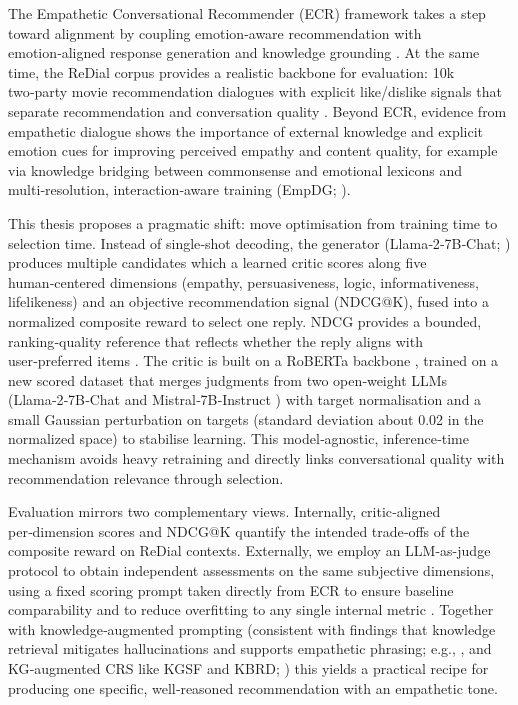 \documentclass[12pt]{article}
\begin{document}
  The Empathetic Conversational Recommender (ECR) framework takes a step toward alignment by coupling emotion‑aware recommendation with emotion‑aligned response generation and knowledge grounding \citep{zhang2024ecr}. At the same time, the ReDial corpus provides a realistic backbone for evaluation: 10k two‑party movie recommendation dialogues with explicit like/dislike signals that separate recommendation and conversation quality \citep{charlin2018redial}. Beyond ECR, evidence from empathetic dialogue shows the importance of external knowledge and explicit emotion cues for improving perceived empathy and content quality, for example via knowledge bridging between commonsense and emotional lexicons \citep{zeng2022knowledgebridging} and multi‑resolution, interaction‑aware training (EmpDG; \citealp{li2020empdg}).
  
  This thesis proposes a pragmatic shift: move optimisation from training time to selection time. Instead of single‑shot decoding, the generator (Llama‑2‑7B‑Chat; \citealp{meta2023llama2}) produces multiple candidates which a learned critic scores along five human‑centered dimensions (empathy, persuasiveness, logic, informativeness, lifelikeness) and an objective recommendation signal (NDCG@K), fused into a normalized composite reward to select one reply. NDCG provides a bounded, ranking‑quality reference that reflects whether the reply aligns with user‑preferred items \citep{evidently_ndcg}. The critic is built on a RoBERTa backbone \citep{liu2019roberta}, trained on a new scored dataset that merges judgments from two open‑weight LLMs (Llama‑2‑7B‑Chat \citep{meta2023llama2} and Mistral‑7B‑Instruct \citep{mistral2023}) with target normalisation and a small Gaussian perturbation on targets (standard deviation about 0.02 in the normalized space) to stabilise learning. This model‑agnostic, inference‑time mechanism avoids heavy retraining and directly links conversational quality with recommendation relevance through selection.
  
  Evaluation mirrors two complementary views. Internally, critic‑aligned per‑dimension scores and NDCG@K quantify the intended trade‑offs of the composite reward on ReDial contexts. 
  Externally, we employ an LLM-as-judge protocol to obtain independent assessments on the same subjective dimensions, using a fixed scoring prompt taken directly from ECR to ensure baseline comparability and to reduce overfitting to any single internal metric \citep{zhang2024ecr,yan2023llmjudge}. Together with knowledge‑augmented prompting (consistent with findings that knowledge retrieval mitigates hallucinations and supports empathetic phrasing; e.g., \citealp{zeng2022knowledgebridging}, and KG‑augmented CRS like KGSF and KBRD; \citealp{zhou2020kgsf,chen2020kbrd}) this yields a practical recipe for producing one specific, well‑reasoned recommendation with an empathetic tone.
  
\end{document}
